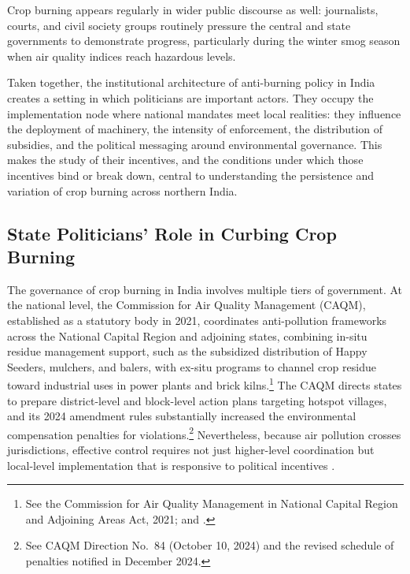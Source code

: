 \documentclass[12pt]{article}
\begin{document}
Crop burning appears regularly in wider public discourse as well: journalists, courts, and civil society groups routinely pressure the central and state governments to demonstrate progress, particularly during the winter smog season when air quality indices reach hazardous levels.
 
Taken together, the institutional architecture of anti-burning policy in India creates a setting in which politicians are important actors. They occupy the implementation node where national mandates meet local realities: they influence the deployment of machinery, the intensity of enforcement, the distribution of subsidies, and the political messaging around environmental governance. This makes the study of their incentives, and the conditions under which those incentives bind or break down, central to understanding the persistence and variation of crop burning across northern India.
 

 
 
\subsection{State Politicians' Role in Curbing Crop Burning}\label{ssec:politicians_role}
 
The governance of crop burning in India involves multiple tiers of government. At the national level, the Commission for Air Quality Management (CAQM), established as a statutory body in 2021, coordinates anti-pollution frameworks across the National Capital Region and adjoining states, combining in-situ residue management support, such as the subsidized distribution of Happy Seeders, mulchers, and balers, with ex-situ programs to channel crop residue toward industrial uses in power plants and brick kilns.\footnote{See the Commission for Air Quality Management in National Capital Region and Adjoining Areas Act, 2021; and \citealp{pib_caqm_2024}.} The CAQM directs states to prepare district-level and block-level action plans targeting hotspot villages, and its 2024 amendment rules substantially increased the environmental compensation penalties for violations.\footnote{See CAQM Direction No.\ 84 (October 10, 2024) and the revised schedule of penalties notified in December 2024.} Nevertheless, because air pollution crosses jurisdictions, effective control requires not just higher-level coordination but local-level implementation that is responsive to political incentives \citep{bar_gulzar2025}.
 
\end{document}
